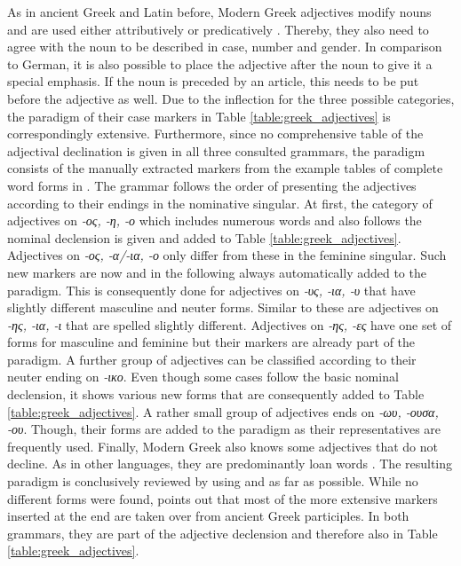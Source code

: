 \documentclass[11pt,a4paper,twoside,openright]{scrbook}
\begin{document}
As in ancient Greek and Latin before, Modern Greek adjectives modify nouns and are used either attributively or predicatively \citep{holton2016greek}. Thereby, they also need to agree with the noun to be described in case, number and gender. In comparison to German, it is also possible to place the adjective after the noun to give it a special emphasis. If the noun is preceded by an article, this needs to be put before the adjective as well. Due to the inflection for the three possible categories, the paradigm of their case markers in Table \ref{table:greek_adjectives} is correspondingly extensive. Furthermore, since no comprehensive table of the adjectival declination is given in all three consulted grammars, the paradigm consists of the manually extracted markers from the example tables of complete word forms in \citet{holton2016greek}. The grammar follows the order of presenting the adjectives according to their endings in the nominative singular. At first, the category of adjectives on \foreignlanguage{greek}{\textit{-ος, -η, -ο}} which includes numerous words and also follows the nominal declension is given and added to Table \ref{table:greek_adjectives}. Adjectives on \foreignlanguage{greek}{\textit{-ος, -α/-ια, -ο}} only differ from these in the feminine singular. Such new markers are now and in the following always automatically added to the paradigm. This is consequently done for adjectives on \foreignlanguage{greek}{\textit{-υς, -ια, -υ}} that have slightly different masculine and neuter forms. Similar to these are adjectives on \foreignlanguage{greek}{\textit{-ης, -ια, -ι}} that are spelled slightly different. Adjectives on \foreignlanguage{greek}{\textit{-ης, -ες}} have one set of forms for masculine and feminine but their markers are already part of the paradigm. A further group of adjectives can be classified according to their neuter ending on \foreignlanguage{greek}{\textit{-ικο}}. Even though some cases follow the basic nominal declension, it shows various new forms that are consequently added to Table \ref{table:greek_adjectives}. A rather small group of adjectives ends on \foreignlanguage{greek}{\textit{-ωυ, -ουσα, -ου}}. Though, their forms are added to the paradigm as their representatives are frequently used. Finally, Modern Greek also knows some adjectives that do not decline. As in other languages, they are predominantly loan words \citep{holton2016greek}. The resulting paradigm is conclusively reviewed by using \citet{metger1998greek} and \citet{ruge2001greek} as far as possible. While no different forms were found, \citet{ruge2001greek} points out that most of the more extensive markers inserted at the end are taken over from ancient Greek participles. In both grammars, they are part of the adjective declension and therefore also in Table \ref{table:greek_adjectives}.
\end{document}
